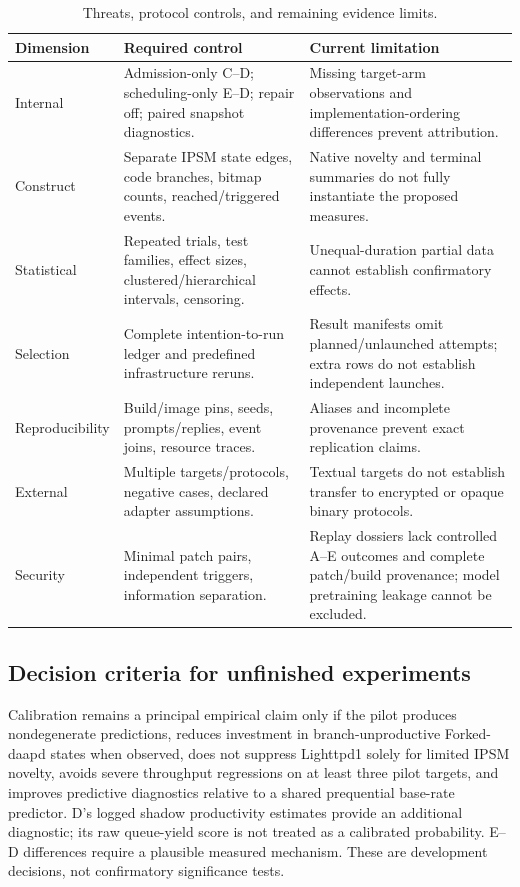 \documentclass[final,5p,times,number]{elsarticle}
\begin{document}
\begin{table}[!tbp]
\centering\small
\caption{Threats, protocol controls, and remaining evidence limits.}
\label{tab:threats}
\begin{tabularx}{\textwidth}{l Y Y}
\toprule
Dimension & Required control & Current limitation \\
\midrule
Internal & Admission-only C--D; scheduling-only E--D; repair off; paired snapshot diagnostics. & Missing target-arm observations and implementation-ordering differences prevent attribution. \\
Construct & Separate IPSM state edges, code branches, bitmap counts, reached/triggered events. & Native novelty and terminal summaries do not fully instantiate the proposed measures. \\
Statistical & Repeated trials, test families, effect sizes, clustered/hierarchical intervals, censoring. & Unequal-duration partial data cannot establish confirmatory effects. \\
Selection & Complete intention-to-run ledger and predefined infrastructure reruns. & Result manifests omit planned/unlaunched attempts; extra rows do not establish independent launches. \\
Reproducibility & Build/image pins, seeds, prompts/replies, event joins, resource traces. & Aliases and incomplete provenance prevent exact replication claims. \\
External & Multiple targets/protocols, negative cases, declared adapter assumptions. & Textual targets do not establish transfer to encrypted or opaque binary protocols. \\
Security & Minimal patch pairs, independent triggers, information separation. & Replay dossiers lack controlled A--E outcomes and complete patch/build provenance; model pretraining leakage cannot be excluded. \\
\bottomrule
\end{tabularx}
\end{table}

\subsection{Decision criteria for unfinished experiments}
Calibration remains a principal empirical claim only if the pilot produces nondegenerate predictions, reduces investment in branch-unproductive Forked-daapd states when observed, does not suppress Lighttpd1 solely for limited IPSM novelty, avoids severe throughput regressions on at least three pilot targets, and improves predictive diagnostics relative to a shared prequential base-rate predictor. D's logged shadow productivity estimates provide an additional diagnostic; its raw queue-yield score is not treated as a calibrated probability. E--D differences require a plausible measured mechanism. These are development decisions, not confirmatory significance tests.
\end{document}
